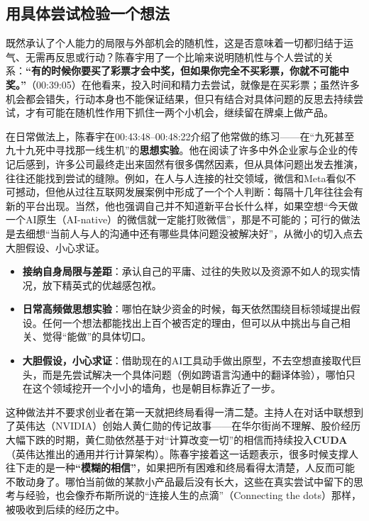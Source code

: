 \documentclass[UTF8,a4paper,11pt,fontset=fandol]{ctexart}
\begin{document}
\subsection{用具体尝试检验一个想法}
既然承认了个人能力的局限与外部机会的随机性，这是否意味着一切都归结于运气、无需再反思或行动？陈春宇用了一个比喻来说明随机性与个人尝试的关系：\textbf{“有的时候你要买了彩票才会中奖，但如果你完全不买彩票，你就不可能中奖。”}（00:39:05）在他看来，投入时间和精力去尝试，就像是在买彩票；虽然许多机会都会错失，行动本身也不能保证结果，但只有结合对具体问题的反思去持续尝试，才有可能在随机性作用下抓住一两个小机会，继续留在牌桌上做产品。

在日常做法上，陈春宇在00:43:48–00:48:22介绍了他常做的练习——在“九死甚至九十九死中寻找那一线生机”的\textbf{思想实验}。他在阅读了许多中外企业家与企业的传记后感到，许多公司最终走出来固然有很多偶然因素，但从具体问题出发去推演，往往还能找到尝试的缝隙。例如，在人与人连接的社交领域，微信和Meta看似不可撼动，但他从过往互联网发展案例中形成了一个个人判断：每隔十几年往往会有新的平台出现。当然，他也强调自己并不知道新平台长什么样，如果空想“今天做一个AI原生（AI-native）的微信就一定能打败微信”，那是不可能的；可行的做法是去细想“当前人与人的沟通中还有哪些具体问题没被解决好”，从微小的切入点去大胆假设、小心求证。

\begin{itemize}
\item \textbf{接纳自身局限与差距}：承认自己的平庸、过往的失败以及资源不如人的现实情况，放下精英式的优越感包袱。
\item \textbf{日常高频做思想实验}：哪怕在缺少资金的时候，每天依然围绕目标领域提出假设。任何一个想法都能找出上百个被否定的理由，但可以从中挑出与自己相关、觉得“能做”的具体切口。
\item \textbf{大胆假设，小心求证}：借助现在的AI工具动手做出原型，不去空想直接取代巨头，而是先尝试解决一个具体问题（例如跨语言沟通中的翻译体验），哪怕只在这个领域挖开一个小小的墙角，也是朝目标靠近了一步。
\end{itemize}

这种做法并不要求创业者在第一天就把终局看得一清二楚。主持人在对话中联想到了英伟达（NVIDIA）创始人黄仁勋的传记故事——在华尔街尚不理解、股价经历大幅下跌的时期，黄仁勋依然基于对“计算改变一切”的相信而持续投入\textbf{CUDA}（英伟达推出的通用并行计算架构）。陈春宇接着这一话题表示，很多时候支撑人往下走的是一种\textbf{“模糊的相信”}，如果把所有困难和终局看得太清楚，人反而可能不敢动身了。哪怕当前做的某款小产品最后没有长大，这些在真实尝试中留下的思考与经验，也会像乔布斯所说的“连接人生的点滴”（Connecting the dots）那样，被吸收到后续的经历之中。
\end{document}
